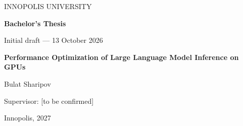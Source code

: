 \documentclass[oneside,final,14pt,a4paper]{extreport}
\begin{document}
\thispagestyle{empty}
\begin{center}
INNOPOLIS UNIVERSITY\par
\vspace{3cm}

{\Large\bfseries Bachelor's Thesis\par}
\vspace{0.6cm}
Initial draft --- 13 October 2026\par
\vspace{1.3cm}

{\Large\bfseries Performance Optimization of Large Language Model Inference on GPUs\par}
\vspace{1.8cm}

Bulat Sharipov\par
\vspace{0.6cm}
Supervisor: [to be confirmed]\par
\vfill

Innopolis, 2027\par
\end{center}
\end{document}
